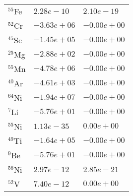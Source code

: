 \begin{tabular}{lll}
 $^{55}$Fe & $2.28e-10 $                                                        & $2.10e-19 $                                                                     \\
 $^{52}$Cr & $-3.63e+06 $                                                       & $-0.00e+00 $                                                                    \\
 $^{45}$Sc & $-1.45e+05 $                                                       & $-0.00e+00 $                                                                    \\
 $^{25}$Mg & $-2.88e+02 $                                                       & $-0.00e+00 $                                                                    \\
 $^{55}$Mn & $-4.78e+06 $                                                       & $-0.00e+00 $                                                                    \\
 $^{40}$Ar & $-4.61e+03 $                                                       & $-0.00e+00 $                                                                    \\
 $^{64}$Ni & $-1.94e+07 $                                                       & $-0.00e+00 $                                                                    \\
 $^{7}$Li  & $-5.76e+01 $                                                       & $-0.00e+00 $                                                                    \\
 $^{55}$Ni & $1.13e-35 $                                                        & $0.00e+00 $                                                                     \\
 $^{49}$Ti & $-1.64e+05 $                                                       & $-0.00e+00 $                                                                    \\
 $^{9}$Be  & $-5.76e+01 $                                                       & $-0.00e+00 $                                                                    \\
 $^{56}$Ni & $2.97e-12 $                                                        & $2.85e-21 $                                                                     \\
 $^{52}$V  & $7.40e-12 $                                                        & $0.00e+00 $                                                                     \\

\end{tabular}
